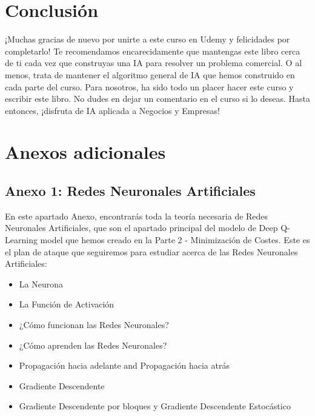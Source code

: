 \documentclass[
]{book}
\providecommand{\tightlist}{%
  \setlength{\itemsep}{0pt}\setlength{\parskip}{0pt}}
\begin{document}
\hypertarget{conclusiuxf3n}{%
\chapter*{Conclusión}\label{conclusiuxf3n}}

¡Muchas gracias de nuevo por unirte a este curso en Udemy y felicidades por completarlo! Te recomendamos encarecidamente que mantengas este libro cerca de ti cada vez que construyas una IA para resolver un problema comercial. O al menos, trata de mantener el algoritmo general de IA que hemos construido en cada parte del curso. Para nosotros, ha sido todo un placer hacer este curso y escribir este libro. No dudes en dejar un comentario en el curso si lo deseas. Hasta entonces, ¡disfruta de IA aplicada a Negocios y Empresas!

\hypertarget{anexos-adicionales}{%
\chapter{Anexos adicionales}\label{anexos-adicionales}}

\hypertarget{anexo-1-redes-neuronales-artificiales}{%
\section{Anexo 1: Redes Neuronales Artificiales}\label{anexo-1-redes-neuronales-artificiales}}

En este apartado Anexo, encontrarás toda la teoría necesaria de Redes Neuronales Artificiales, que son el apartado principal del modelo de Deep Q-Learning model que hemos creado en la Parte 2 - Minimización de Costes. Este es el plan de ataque que seguiremos para estudiar acerca de las Redes Neuronales Artificiales:

\begin{itemize}
\tightlist
\item
  La Neurona
\item
  La Función de Activación
\item
  ¿Cómo funcionan las Redes Neuronales?
\item
  ¿Cómo aprenden las Redes Neuronales?
\item
  Propagación hacia adelante and Propagación hacia atrás
\item
  Gradiente Descendente
\item
  Gradiente Descendente por bloques y Gradiente Descendente Estocástico
\end{itemize}
\end{document}
